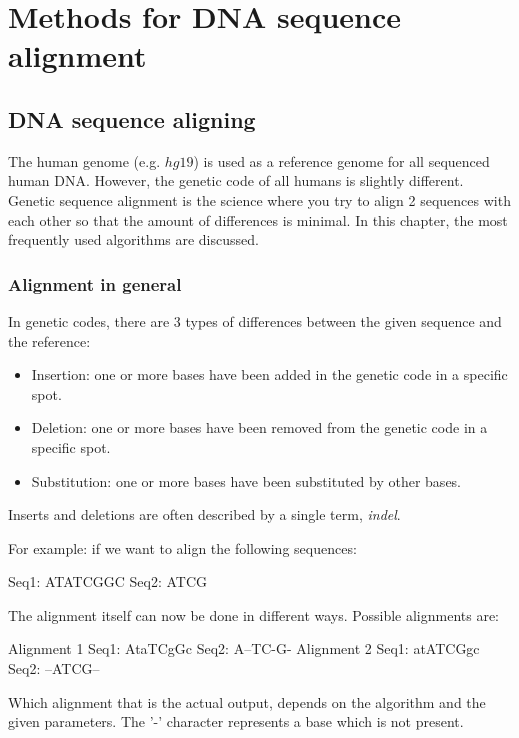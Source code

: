 
\chapter{Methods for DNA sequence alignment}
\label{ch:algoverzicht}


\section{DNA sequence aligning}

The human genome (e.g. $hg19$) is used as a reference genome for all sequenced human DNA. However, the genetic code of all humans is slightly different. Genetic sequence alignment is the science where you try to align 2 sequences with each other so that the amount of differences is minimal. In this chapter, the most frequently used algorithms are discussed.

\subsection{Alignment in general}

In genetic codes, there are 3 types of differences between the given sequence and the reference:

\begin{itemize}
	\item Insertion: one or more bases have been added in the genetic code in a specific spot.
	\item Deletion: one or more bases have been removed from the genetic code in a specific spot.
	\item Substitution: one or more bases have been substituted by other bases.
\end{itemize}

Inserts and deletions are often described by a single term, \emph{indel}.

For example: if we want to align the following sequences:
\begin{lcverbatim}
	Seq1: ATATCGGC
	Seq2: ATCG
\end{lcverbatim}
The alignment itself can now be done in different ways. Possible alignments are:
\begin{lcverbatim}
	Alignment 1
	Seq1: AtaTCgGc
	Seq2: A--TC-G-
	Alignment 2
	Seq1: atATCGgc
	Seq2: --ATCG--
\end{lcverbatim}
Which alignment that is the actual output, depends on the algorithm and the given parameters. The '-' character represents a base which is not present.

